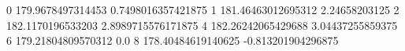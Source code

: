 0 179.9678497314453 0.7498016357421875
1 181.46463012695312 2.24658203125
2 182.1170196533203 2.8989715576171875
4 182.26242065429688 3.04437255859375
6 179.21804809570312 0.0
8 178.40484619140625 -0.813201904296875
